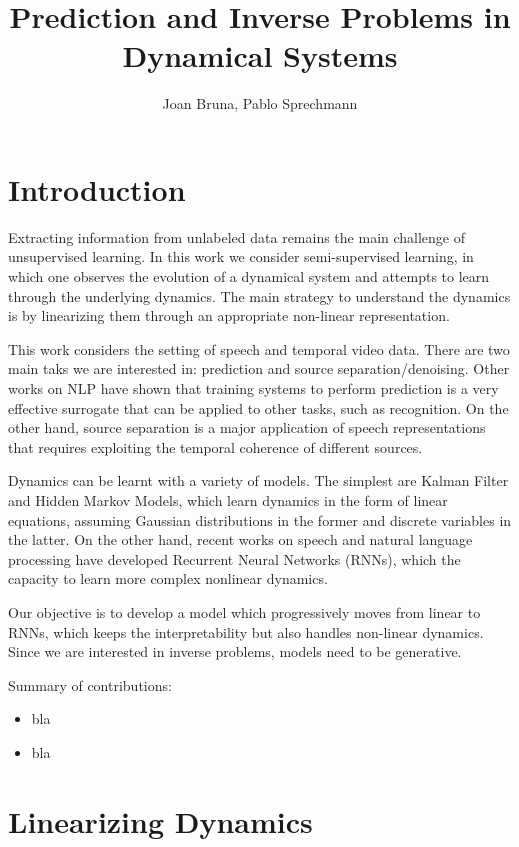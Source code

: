 \documentclass[11pt]{article} %
\title{Prediction and Inverse Problems in Dynamical Systems}
\author{Joan Bruna, Pablo Sprechmann}
\begin{document}
\maketitle

\section*{Introduction}

Extracting information from unlabeled data remains the main challenge of unsupervised learning. 
In this work we consider semi-supervised learning, in which one observes the evolution of a dynamical system 
and attempts to learn through the underlying dynamics. 
The main strategy to understand the dynamics is by linearizing them through an appropriate non-linear representation.

This work considers the setting of speech and temporal video data. 
There are two main taks we are interested in: prediction and source separation/denoising. 
Other works on NLP have shown that training systems to perform prediction is a very effective surrogate that 
can be applied to other tasks, such as recognition. On the other hand, source separation is a major application
of speech representations that requires exploiting the temporal coherence of different sources. 

Dynamics can be learnt with a variety of models. The simplest are Kalman Filter and Hidden Markov Models, which
learn dynamics in the form of linear equations, assuming Gaussian distributions in the former and discrete variables in the latter. 
On the other hand, recent works on speech and natural language processing have developed Recurrent Neural Networks (RNNs), 
which the capacity to learn more complex nonlinear dynamics. 

Our objective is to develop a model which progressively moves from linear to RNNs, which keeps the interpretability but also 
handles non-linear dynamics. 
Since we are interested in inverse problems, models need to be generative. 

Summary of contributions:
\begin{itemize}
\item bla 
\item bla
\end{itemize}


\section{Linearizing Dynamics}
\end{document}
